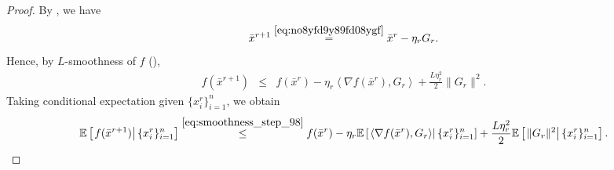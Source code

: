 \documentclass{article}
\newcommand{\anglebr}[1]{\left\langle#1\right\rangle} %
\newcommand{\inner}[2]{\anglebr{#1, #2}}
\newcommand{\ExpCond}[2]{{\mathbb{E}}\left[\left.#1\right\vert#2\right]}
\theoremstyle{plain}
\theoremstyle{definition}
\begin{document}
\begin{proof}
By , we have
\begin{equation*}
\bar x^{r+1}
\overset{\eqref{eq:no8yfd9y89fd08ygf}}{=}
\bar x^r-\eta_r G_r.
\end{equation*}
Hence, by \(L\)-smoothness of \(f\) (),
\begin{eqnarray}
f(\bar x^{r+1})
&\le&
f(\bar x^r)
-
\eta_r \inner{\nabla f(\bar x^r)}{G_r}
+
\frac{L\eta_r^2}{2}\|G_r\|^2.
\label{eq:smoothness_step_98}
\end{eqnarray}
Taking conditional expectation given \(\{x_i^r\}_{i=1}^n\), we obtain
\begin{eqnarray}
\ExpCond{ f(\bar x^{r+1}) }{ \{x_i^r\}_{i=1}^n }
\overset{\eqref{eq:smoothness_step_98}}{\leq}
f(\bar x^r)
-
\eta_r \ExpCond{ \inner{\nabla f(\bar x^r)}{G_r} }{ \{x_i^r\}_{i=1}^n }
+
\frac{L\eta_r^2}{2}\ExpCond{ \|G_r\|^2 }{ \{x_i^r\}_{i=1}^n }.
\label{eq:start_one_round_descent_0980fd}
\end{eqnarray}


\end{proof}
\end{document}
